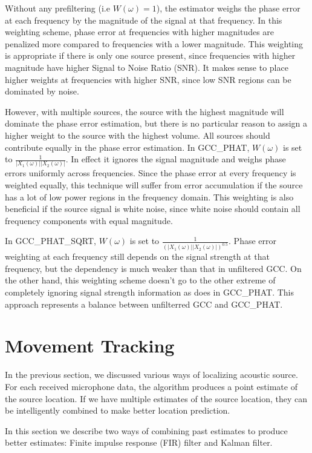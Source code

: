 Without any prefiltering (i.e $W(\omega)=1$), the estimator weighs the phase error at each frequency by the magnitude of the signal at that frequency. In this weighting scheme, phase error at frequencies with higher magnitudes are penalized more compared to frequencies with a lower magnitude. This weighting is appropriate if there is only one source present, since frequencies with higher magnitude have higher Signal to Noise Ratio (SNR). It makes sense to place higher weights at frequencies with higher SNR, since low SNR regions can be dominated by noise. 

However, with multiple sources, the source with the highest magnitude will dominate the phase error estimation, but there is no particular reason to assign a higher weight to the source with the highest volume. All sources should contribute equally in the phase error estimation. In GCC\_PHAT,  $W(\omega)$ is set to $\frac{1}{|X_1(\omega)||X_2(\omega)|}$. In effect it ignores the signal magnitude and weighs phase errors uniformly across frequencies. Since the phase error at every frequency is weighted equally, this technique will suffer from error accumulation if the source has a lot of low power regions in the frequency domain. This weighting is also beneficial if the source signal is white noise, since white noise should contain all frequency components with equal magnitude.

In GCC\_PHAT\_SQRT, $W(\omega)$ is set to $\frac{1}{(|X_1(\omega)||X_2(\omega)|)^{0.5}}$. Phase error weighting at each frequency still depends on the signal strength at that frequency, but the dependency is much weaker than that in unfiltered GCC. On the other hand, this weighting scheme doesn't go to the other extreme of completely ignoring signal strength information as does in GCC\_PHAT. This approach represents a balance between unfilterred GCC and GCC\_PHAT.

\section{Movement Tracking}
In the previous section, we discussed various ways of localizing acoustic source. For each received microphone data, the algorithm produces a point estimate of the source location. If we have multiple estimates of the source location, they can be intelligently combined to make better location prediction. 

In this section we describe two ways of combining past estimates to produce better estimates: Finite impulse response (FIR) filter and Kalman filter.

